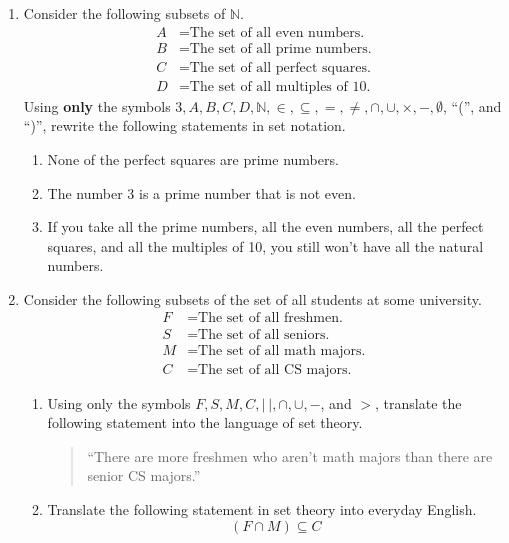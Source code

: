 \documentclass{article}
\newcommand{\N}{\mathbb{N}}
\theoremstyle{definition}
\begin{document}
\begin{question}
   \begin{enumerate}
   \item Consider the following subsets of $\N$.
       \begin{align*}
           A &= \text{The set of all even numbers.}\\
           B &= \text{The set of all prime numbers.}\\
           C &= \text{The set of all perfect squares.}\\
           D &= \text{The set of all multiples of 10.}
       \end{align*}
       Using \textbf{only} the symbols $3, A, B, C, D, \N, \in, \subseteq, =, \neq, \cap, \cup, \times, -, \emptyset$, ``('', and  ``)'', rewrite the following statements in set notation. 
           \begin{enumerate}
               \item None of the perfect squares are prime numbers. 
               \item The number 3 is a prime number that is not even.
               \item If you take all the prime numbers, all the even numbers, all the perfect squares, and all the multiples of 10, you still won't have all the natural numbers.
           \end{enumerate}
   
   \item Consider the following subsets of the set of all students at some university. 
       \begin{align*}
           F &= \text{The set of all freshmen.}\\
           S &= \text{The set of all seniors.}\\
           M &= \text{The set of all math majors.}\\
           C &= \text{The set of all CS majors.}
       \end{align*}
           \begin{enumerate}
               \item Using only the symbols $F, S, M, C, | ~ |, \cap, \cup, -$, and $>$, translate the following statement into the language of set theory. 
               \begin{quote}
                   ``There are more freshmen who aren't math majors than there are senior CS majors.''
               \end{quote}
               \item Translate the following statement in set theory into everyday English. 
               $$(F\cap M)\subseteq C$$
           \end{enumerate}
   \end{enumerate}
\end{question}
\end{document}
